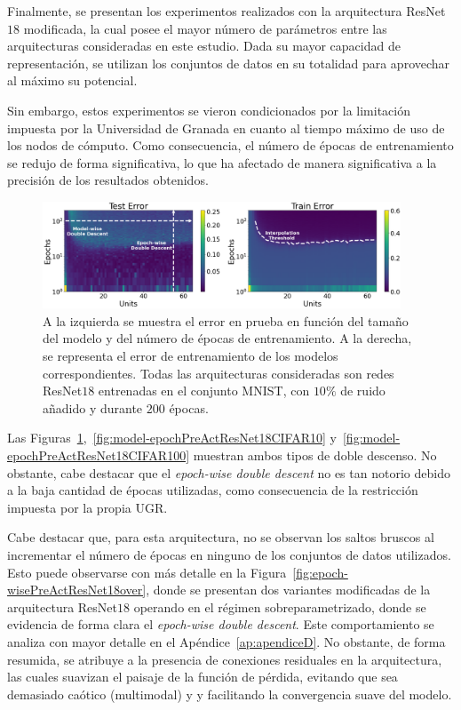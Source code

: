 Finalmente, se presentan los experimentos realizados con la arquitectura ResNet$18$ modificada, la cual posee el mayor número de parámetros entre las arquitecturas consideradas en este estudio. Dada su mayor capacidad de representación, se utilizan los conjuntos de datos en su totalidad para aprovechar al máximo su potencial.

Sin embargo, estos experimentos se vieron condicionados por la limitación impuesta por la Universidad de Granada en cuanto al tiempo máximo de uso de los nodos de cómputo. Como consecuencia, el número de épocas de entrenamiento se redujo de forma significativa, lo que ha afectado de manera significativa a la precisión de los resultados obtenidos.

\begin{figure}[h]
    \centering
    \includegraphics[width=0.95\textwidth]{img/experiments/model-epochPreActResNet18MNIST.png}
    \caption[Doble descenso en función del tamaño del modelo y del número de épocas para la red ResNet$18$ y el conjunto MNIST.]{A la izquierda se muestra el error en prueba en función del tamaño del modelo y del número de épocas de entrenamiento. A la derecha, se representa el error de entrenamiento de los modelos correspondientes. Todas las arquitecturas consideradas son redes ResNet$18$ entrenadas en el conjunto MNIST, con $10\%$ de ruido añadido y durante $200$ épocas.}\label{fig:model-epochPreActResNet18MNIST}
\end{figure}

Las Figuras~\ref{fig:model-epochPreActResNet18MNIST},~\ref{fig:model-epochPreActResNet18CIFAR10} y~\ref{fig:model-epochPreActResNet18CIFAR100} muestran ambos tipos de doble descenso. No obstante, cabe destacar que el \textit{epoch-wise double descent} no es tan notorio debido a la baja cantidad de épocas utilizadas, como consecuencia de la restricción impuesta por la propia UGR.

Cabe destacar que, para esta arquitectura, no se observan los saltos bruscos al incrementar el número de épocas en ninguno de los conjuntos de datos utilizados. Esto puede observarse con más detalle en la Figura~\ref{fig:epoch-wisePreActResNet18over}, donde se presentan dos variantes modificadas de la arquitectura ResNet$18$ operando en el régimen sobreparametrizado, donde se evidencia de forma clara el \textit{epoch-wise double descent}. Este comportamiento se analiza con mayor detalle en el Apéndice~\ref{ap:apendiceD}. No obstante, de forma resumida, se atribuye a la presencia de conexiones residuales en la arquitectura, las cuales suavizan el paisaje de la función de pérdida, evitando que sea demasiado caótico (multimodal) y y facilitando la convergencia suave del modelo.

